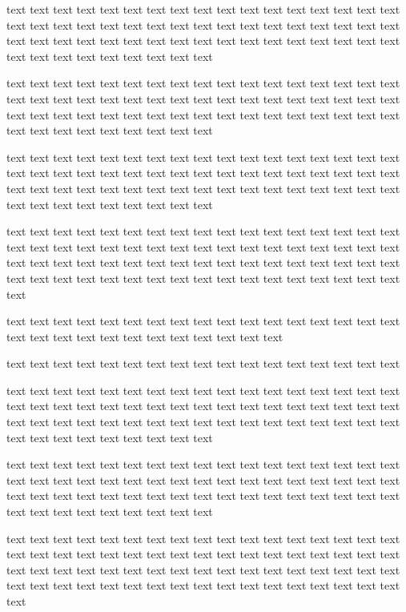 \documentclass{article}
\begin{document}
    text text text text text text text text text text text text text text text text text text text text text text text text text text text text text text text text text text text text text text text text text text text text text text text text text text text text text text text text text text text text

    text text text text text text text text text text text text text text text text text text text text text text text text text text text text text text text text text text text text text text text text text text text text text text text text text text text text text text text text text text text text

    text text text text text text text text text text text text text text text text text text text text text text text text text text text text text text text text text text text text text text text text text text text text text text text text text text text text text text text text text text text text

    text text text text text text text text text text text text text text text text text text text text text text text text text text text text text text text text text text text text text text text text text text text text text text text text text text text text text text text text text text text text text text text text text text text text text

    text text text text text text text text text text text text text text text text text text text text text text text text text text text text text

    text text text text text text text text text text text text text text text text text

text text text text text text text text text text text text text text text text text text text text text text text text text text text text text text text text text text text text text text text text text text text text text text text text text text text text text text text text text text text text

    text text text text text text text text text text text text text text text text text text text text text text text text text text text text text text text text text text text text text text text text text text text text text text text text text text text text text text text text text text text text

    text text text text text text text text text text text text text text text text text text text text text text text text text text text text text text text text text text text text text text text text text text text text text text text text text text text text text text text text text text text text text text text text text text text text text
\end{document}
